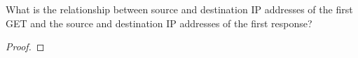 \documentclass[../../main.tex]{subfiles}
\begin{document}
\begin{wts}
What is the relationship between source and destination IP addresses of the first GET and the source and destination IP addresses of the first response?
\end{wts}
\begin{proof}

\end{proof}
\end{document}
